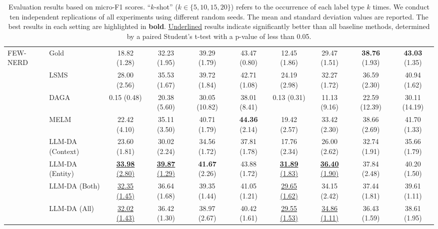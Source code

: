 \documentclass[11pt]{article}
\begin{document}
\begin{table}[!t]
{\begin{tabular}{l|l|cccc|cccc}
        \multirow{9}{*}{{FEW-NERD}} & Gold & 18.82 (1.28) & 32.23 (1.95) & 39.29 (1.79) & 43.47 (0.80) & 12.45 (1.86) & 29.47 (1.51) & \textbf{38.76} (1.93) & \textbf{43.03} (1.35) \\ 
        ~ & LSMS & 28.00 (2.56) & 35.53 (1.67) & 39.72 (1.84) & 42.71 (1.08) & 24.19 (2.98) & 32.27 (1.72) & 36.59 (2.30) & 40.94 (1.62) \\ 
        ~ & DAGA & 0.15 (0.48) & 20.38 (5.60) & 30.05 (10.82) & 38.01 (8.41) & 0.13 (0.31) & 11.13 (9.16) & 22.59 (12.39) & 30.11 (14.19) \\ 
        ~ & MELM & 22.42 (4.10) & 35.11 (3.50) & 40.71 (1.79) & \textbf{44.36} (2.14) & 19.42 (2.57) & 33.42 (2.30) & 38.66 (2.69) & 41.70 (1.33) \\ 
        \rowcolor{gray!10} \cellcolor{gray!0}FEW-NERD & LLM-DA (Context) & 23.60 (1.81) & {30.02 (2.24)} & 34.56 (1.72) & 37.81 (1.78) & 17.76 (2.34) & {26.00 (2.62)} & {32.74 (1.91)} & 35.66 (1.79) \\ 
        \rowcolor{gray!10} \cellcolor{gray!0}~ & LLM-DA (Entity) & \underline{\textbf{33.98} (2.80)} & \underline{\textbf{39.87} (1.29)} & \textbf{41.67} (2.26) & 43.88 (1.72) & \underline{\textbf{31.89} (1.83)} & \underline{\textbf{36.40} (1.90)} & 37.84 (2.48) & 40.20 (1.50) \\ 
        \rowcolor{gray!10} \cellcolor{gray!0}~ & LLM-DA (Both) & \underline{32.35 (1.45)} & 36.64 (1.68) & 39.35 (1.44) & 41.05 (1.21) & \underline{29.65 (1.62)} & 34.15 (2.42) & 37.44 (1.81) & {39.61 (1.11)} \\ 
        \rowcolor{gray!10} \cellcolor{gray!0}~ & LLM-DA (All) & \underline{32.02 (1.43)} & 36.42 (1.30) & 38.97 (2.67) & 40.42 (1.61) & \underline{29.55 (1.53)} & \underline{34.86 (1.11)} & 36.43 (1.59) & {38.61 (1.95)} \\
        \bottomrule
        
        \end{tabular}}
    \caption{Evaluation results based on micro-F1 scores. ``$k$-shot'' ($k \in \{5, 10, 15, 20\}$) refers to the occurrence of each label type $k$ times. We conduct ten independent replications of all experiments using different random seeds. The mean and standard deviation values are reported. The best results in each setting are highlighted in \textbf{bold}. \underline{Underlined} results indicate significantly better than all baseline methods, determined by a paired Student's t-test with a p-value of less than 0.05.}
    \label{tab:main_result}
\end{table}
\end{document}
